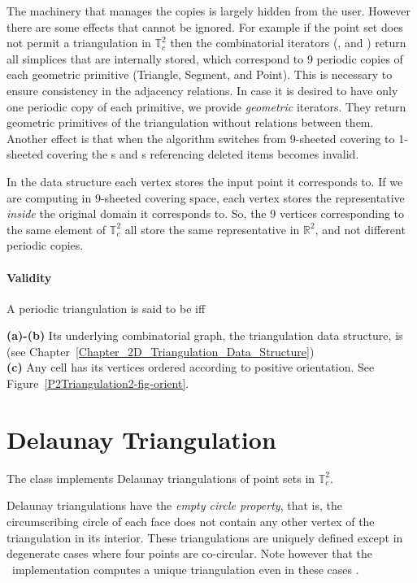 The machinery that manages the copies is largely hidden from the
user. However there are some effects that cannot be ignored. For
example if the point set does not permit a triangulation in $\mathbb
T_c^2$ then the combinatorial iterators (,
 and ) return all simplices
that are internally stored, which correspond to 9 periodic copies of
each geometric primitive (Triangle, Segment, and Point). This is
necessary to ensure consistency in the adjacency relations. In case it
is desired to have only one periodic copy of each primitive, we
provide \emph{geometric} iterators. They return geometric primitives
of the triangulation without relations between them. Another effect is
that when the algorithm switches from 9-sheeted covering to 1-sheeted
covering the s and s referencing
deleted items becomes invalid.

In the data structure each vertex stores the input point it
corresponds to. If we are computing in 9-sheeted covering 
space, each vertex stores the representative \emph{inside} the
original domain it corresponds to. So, the 9 vertices corresponding
to the same element of $\mathbb T_c^2$ all store the same
representative in $\mathbb R^2$, and not different periodic copies.

\paragraph{Validity}
A periodic triangulation is said to be  iff

{\bf (a)-(b)} Its underlying combinatorial graph, the triangulation
data structure, is 
(see Chapter~\ref{Chapter_2D_Triangulation_Data_Structure})\\
{\bf (c)} Any cell has its vertices ordered according to positive
orientation. See Figure~\ref{P2Triangulation2-fig-orient}.

\section{Delaunay Triangulation} 
The class  implements Delaunay
triangulations of point sets in $\mathbb T_c^2$.

Delaunay triangulations have the \textit{empty circle property},
that is, the circumscribing circle of each face does not contain any
other vertex of the triangulation in its interior. These
triangulations are uniquely defined except in degenerate cases where
four points are co-circular.  Note however that the \cgal\
implementation computes a unique triangulation even in these cases
\cite{cgal:dt-pvr3d-03}.

